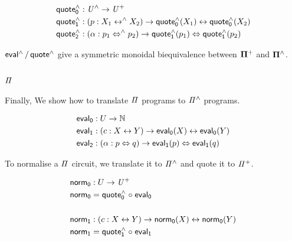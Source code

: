 \begin{definition}
  \begin{align*}
    \quoteh_{0} & : \UHat \to \UPlus                                                            \\
    \quoteh_{1} & : (p : X_{1} \isoh X_{2}) \to \quoteh_{0}(X_{1}) \iso \quoteh_{0}(X_{2})      \\
    \quoteh_{2} & : (\alpha : p_{1} \Isoh p_{2}) \to \quoteh_{1}(p_{1}) \Iso \quoteh_{1}(p_{2}) \\
  \end{align*}
\end{definition}

\begin{proposition}
  $\evalh/\quoteh$ give a symmetric monoidal biequivalence between $\mathbf{\Pi^{+}}$ and $\mathbf{\Pi^{\wedge}}$.
\end{proposition}

\subsection{$\mathit{\Pi}$}

Finally, We show how to translate $\mathit{\Pi}$ programs to $\mathit{{\Pi}^{\wedge}}$ programs.

\begin{definition}
  \begin{align*}
    \evalt_{0} & : U \to \Nat                                               \\
    \evalt_{1} & : (c : X \iso Y) \to \evalt_{0}(X) \iso \evalt_{0}(Y)      \\
    \evalt_{2} & : (\alpha : p \Iso q) \to \evalt_{1}(p) \Iso \evalt_{1}(q) \\
  \end{align*}
\end{definition}

To normalise a $\mathit{\Pi}$ circuit, we translate it to $\mathit{{\Pi}^{\wedge}}$ and quote it to $\mathit{{\Pi}^{+}}$.

\begin{definition}
  \begin{align*}
    \normt_{0} & : U \to \UPlus                                        \\
    \normt_{0} & = \quoteh_{0} \comp \evalt_{0}                        \\
    \\
    \normt_{1} & : (c : X \iso Y) \to \normt_{0}(X) \iso \normt_{0}(Y) \\
    \normt_{1} & = \quoteh_{1} \comp \evalt_{1}                        \\
  \end{align*}
\end{definition}

